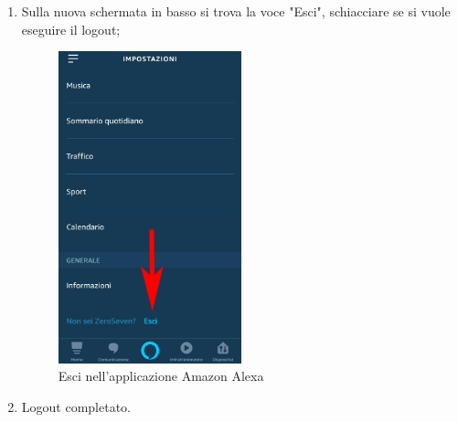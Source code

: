 \begin{enumerate}
\newpage
\item Sulla  nuova schermata in basso si trova la voce "Esci", schiacciare se si vuole eseguire il logout;

\begin{figure}[H]
	\centering
	\includegraphics[width=0.5\textwidth]{images/LogoutAlexa.png}
	\caption{Esci nell'applicazione Amazon Alexa}
\end{figure}

\item Logout completato.
\end{enumerate}

 
 








